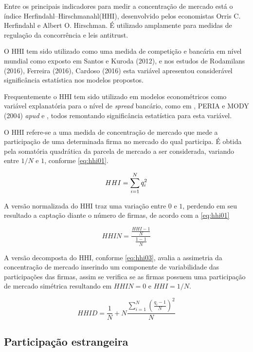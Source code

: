 \documentclass[
  12pt,
  12pt,
  openright,
  oneside,
  a4paper,
  chapter=TITLE,
  section=TITLE,
  subsection=TITLE,
  subsubsection=TITLE,
  english,
  portugues,
  sumario=tradicional]{abntex2}
\begin{document}
Entre os principais indicadores para medir a concentração de mercado está o índice Herfindahl--Hirschmanahl(HHI), desenvolvido pelos economistas Orris C. Herfindahl e Albert O. Hirschman. É utilizado amplamente para medidas de regulação da concorrência e leis antitrust.

O HHI tem sido utilizado como uma medida de competição e bancária em nível mundial como exposto em Santos e Kuroda (2012), e nos estudos de Rodamilans (2016), Ferreira (2016), Cardoso (2016) esta variável apresentou considerável significância estatística nos modelos propostos.

Frequentemente o HHI tem sido utilizado em modelos econométricos como variável explanatória para o nível de \emph{spread} bancário, como em \textcite{dantas:2012}, PERIA e MODY (2004) \emph{apud} \textcite{leal:2006} e \textcite{almeida:2013}, todos remontando significância estatística para esta variável.

O HHI refere-se a uma medida de concentração de mercado que mede a participação de uma determinada firma no mercado do qual participa. É obtida pela somatória quadrática da parcela de mercado a ser considerada, variando entre \(1/N\) e \(1\), conforme \autoref{eq:hhi01}.

\begin{equation}\label{eq:hhi01}
HHI = \sum_{i=1}^{N}q_i^2
\vspace{10pt}
\end{equation}

A versão normalizada do HHI traz uma variação entre \(0\) e \(1\), perdendo em seu resultado a captação diante o número de firmas, de acordo com a \autoref{eq:hhi01}

\begin{equation}\label{eq:hhi02}
HHIN = \frac{\frac{HHI - 1}{N}}{\frac{1-1}{N}}
\end{equation}

A versão decomposta do HHI, conforme \autoref{eq:hhi03}, avalia a assimetria da concentração de mercado inserindo um componente de variabilidade das participações das firmas, assim se verifica se as firmas possuem uma participação de mercado simétrica resultando em \(HHIN = 0\) e \(HHI= 1/N\).

\begin{equation}\label{eq:hhi03}
HHID = \frac{1}{N} + N\frac{\sum_{i=1}^{N}(\frac{q_i - 1}{N})^2}{N}
\end{equation}

\subsection{Participação estrangeira}
\end{document}
